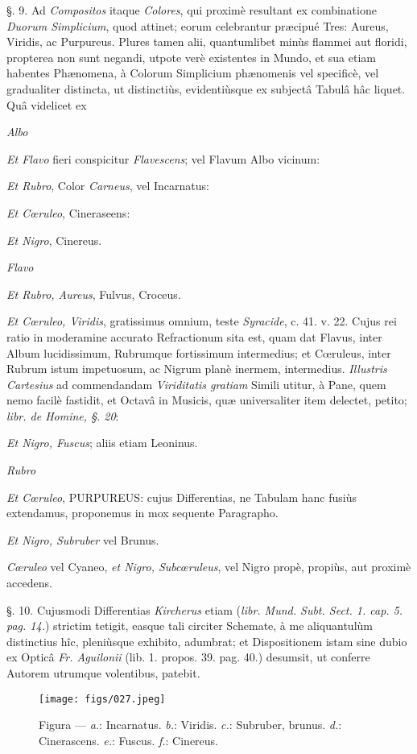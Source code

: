 \documentclass[a4paper, 11pt, oneside, polutonikogreek, german]{article}
\begin{document}
§. 9. Ad \emph{Compositos} itaque \emph{Colores}, qui proximè resultant ex combinatione \emph{Duorum Simplicium}, quod attinet; eorum celebrantur præcipué Tres: Aureus, Viridis, ac Purpureus. Plures tamen alii, quantumlibet minùs flammei aut floridi, propterea non sunt negandi, utpote verè existentes in Mundo, et sua etiam habentes Phænomena, à Colorum Simplicium phænomenis vel specificè, vel gradualiter distincta, ut distinctiùs, evidentiùsque ex subjectâ Tabulâ hâc liquet. Quâ videlicet ex

\emph{Albo}

\emph{Et Flavo} fieri conspicitur \emph{Flavescens}; vel Flavum Albo vicinum:

\emph{Et Rubro}, Color \emph{Carneus}, vel Incarnatus:

\emph{Et Cœruleo}, Cineraseens:

\emph{Et Nigro}, Cinereus.

\emph{Flavo}

\emph{Et Rubro, Aureus}, Fulvus, Croceus.

\emph{Et Cœruleo, Viridis}, gratissimus omnium, teste \emph{Syracide}, c. 41. v. 22. Cujus rei ratio in moderamine accurato Refractionum sita est, quam dat Flavus, inter Album lucidissimum, Rubrumque fortissimum intermedius; et Cœruleus, inter Rubrum istum impetuosum, ac Nigrum planè inermem, intermedius. \emph{Illustris Cartesius} ad commendandam \emph{Viriditatis gratiam} Simili utitur, à Pane, quem nemo facilè fastidit, et Octavâ in Musicis, quæ universaliter item delectet, petito; \emph{libr. de Homine, §. 20}:

\emph{Et Nigro, Fuscus}; aliis etiam Leoninus.

\emph{Rubro}

\emph{Et Cœruleo}, PURPUREUS: cujus Differentias, ne Tabulam hanc fusiùs extendamus, proponemus in mox sequente Paragrapho.

\emph{Et Nigro, Subruber} vel Brunus.

\emph{Cœruleo} vel Cyaneo, \emph{et Nigro, Subcœruleus}, vel Nigro propè, propiùs, aut proximè accedens.

§. 10. Cujusmodi Differentias \emph{Kircherus} etiam (\emph{libr. Mund. Subt. Sect. 1. cap. 5. pag. 14.}) strictim tetigit, easque tali circiter Schemate, à me aliquantulùm distinctius hîc, pleniùsque exhibito, adumbrat; et Dispositionem istam sine dubio ex Opticâ \emph{Fr. Aguilonii} (lib. 1. propos. 39. pag. 40.) desumsit, ut conferre Autorem utrumque volentibus, patebit.

\begin{figure}[H]
\centering
\texttt{[image: figs/027.jpeg]}
\caption{Figura --- \emph{a.}: Incarnatus. \emph{b.}: Viridis. \emph{c.}: Subruber, brunus. \emph{d.}: Cinerascens. \emph{e.}: Fuscus. \emph{f.}: Cinereus.}
\end{figure}
\end{document}
